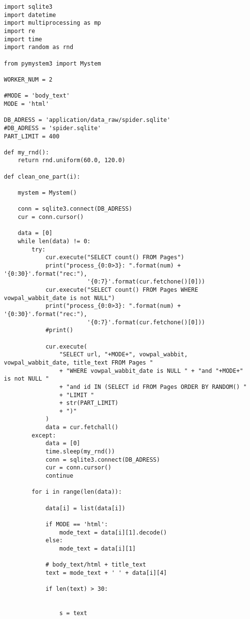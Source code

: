 \documentclass[a4paper,14pt]{extreport}
\begin{document}
\begin{lstlisting}
import sqlite3
import datetime
import multiprocessing as mp
import re
import time
import random as rnd

from pymystem3 import Mystem

WORKER_NUM = 2

#MODE = 'body_text'
MODE = 'html'

DB_ADRESS = 'application/data_raw/spider.sqlite'
#DB_ADRESS = 'spider.sqlite'
PART_LIMIT = 400

def my_rnd():
    return rnd.uniform(60.0, 120.0)

def clean_one_part(i):
    
    mystem = Mystem()
    
    conn = sqlite3.connect(DB_ADRESS)
    cur = conn.cursor()

    data = [0]
    while len(data) != 0:
        try:
            cur.execute("SELECT count() FROM Pages")
            print("process_{0:0>3}: ".format(num) + '{0:30}'.format("rec:"),
                        '{0:7}'.format(cur.fetchone()[0]))
            cur.execute("SELECT count() FROM Pages WHERE vowpal_wabbit_date is not NULL")
            print("process_{0:0>3}: ".format(num) + '{0:30}'.format("rec:"),
                        '{0:7}'.format(cur.fetchone()[0]))
            #print()

            cur.execute(
                "SELECT url, "+MODE+", vowpal_wabbit, vowpal_wabbit_date, title_text FROM Pages "
                + "WHERE vowpal_wabbit_date is NULL " + "and "+MODE+" is not NULL "
                + "and id IN (SELECT id FROM Pages ORDER BY RANDOM() "
                + "LIMIT "
                + str(PART_LIMIT)
                + ")"
            )
            data = cur.fetchall()
        except:
            data = [0]
            time.sleep(my_rnd())
            conn = sqlite3.connect(DB_ADRESS)
            cur = conn.cursor()
            continue

        for i in range(len(data)):

            data[i] = list(data[i])

            if MODE == 'html':
                mode_text = data[i][1].decode()
            else:
                mode_text = data[i][1]

            # body_text/html + title_text
            text = mode_text + ' ' + data[i][4]

            if len(text) > 30:

                
                s = text


\end{lstlisting}
\end{document}
